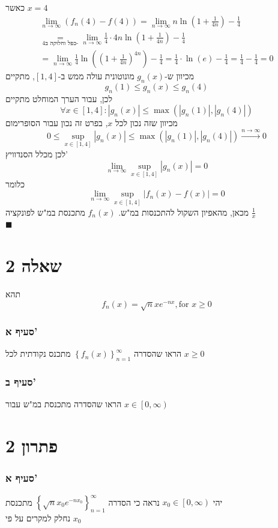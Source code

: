 \documentclass[12pt, titlepage]{article}
\begin{document}
כאשר $x=4$
\begin{gather*}
    \lim_{n\to\infty} \left(f_n\left(4\right) - f\left(4\right)\right) = \lim_{n\to\infty} n\ln\left(1+\frac{1}{4n}\right) -\frac{1}{4} \\
    \underset{4\text{כפל וחלוקה ב-}}{=} \lim_{n\to\infty} \frac{1}{4} \cdot 4n \ln\left(1+\frac{1}{4n}\right) - \frac{1}{4} \\
    =\lim_{n\to\infty} \frac{1}{4} \ln\left(\left(1+\frac{1}{4n}\right)^{4n}\right) - \frac{1}{4} =  \frac{1}{4}\cdot\ln(e) -\frac{1}{4} = \frac{1}{4}-\frac{1}{4} = 0
\end{gather*}
מכיוון ש-$g_n(x)$ מונוטונית עולה ממש ב-$[1,4]$, מתקיים
\[
g_n(1) \leq g_n(x) \leq g_n(4) 
\]
לכן, עבור הערך המוחלט מתקיים
\[
\forall x \in \left[1,4\right]: \left|g_n(x)\right| \leq \max\left(\left|g_n(1)\right|,\left|g_n(4)\right|\right)
\]
מכיוון שזה נכון לכל $x$, בפרט זה נכון עבור הסופרימום
\[
0 \leq \sup_{x\in[1,4]}  \left|g_n(x)\right| \leq \max\left(\left|g_n(1)\right|,\left|g_n(4)\right|\right) \xrightarrow{n\to\infty} 0
\]
לכן מכלל הסנדוויץ'
\[
    \lim_{n\to\infty}    \sup_{x\in[1,4]} \left|g_n(x)\right| = 0
\]
כלומר
\[
    \lim_{n\to\infty}    \sup_{x\in[1,4]} \left|f_n(x) - f(x)\right| = 0
\]
מכאן, מהאפיון השקול להתכנסות במ"ש. $f_n(x)$ מתכנסת במ"ש לפונקציה $\frac{1}{x}$\\
$\blacksquare$
\newpage
\part*{שאלה 2}
תהא
\[
    f_n\left(x\right) = \sqrt{n} x e^{-nx}, \text{for }x\geq 0
\]
\section*{סעיף א'}
הראו שהסדרה $\left\{f_n(x)\right\}^\infty_{n=1}$ מתכנס נקודתית לכל $x\geq 0$
\section*{סעיף ב'}
הראו שהסדרה מתכנסת במ"ש עבור $x \in \left[0,\infty\right)$
\part*{פתרון 2}
\section*{סעיף א'}
יהי $x_0 \in \left[0,\infty\right)$ נראה כי הסדרה $\left\{\sqrt{n}x_0e^{-nx_0}\right\}^\infty_{n=1}$ מתכנסת\\
נחלק למקרים על פי $x_0$
\end{document}
